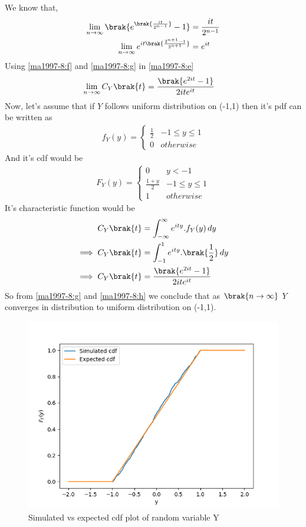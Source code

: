 We know that,
\begin{align}
    \lim_{n\to\infty}\brak{e^{\brak{\frac{it}{2^{n-1}}}}-1} &= \frac{it}{2^{n-1}}
    \label{ma1997-8:f}\\
    \lim_{n\to\infty}e^{it\brak{\frac{2^{n+1}-1}{2^{n+1}}}}&=e^{it}
    \label{ma1997-8:g}
\end{align}
Using \eqref{ma1997-8:f} and \eqref{ma1997-8:g} in \eqref{ma1997-8:e}
\begin{align}
    \lim_{n\to\infty} C_{Y}\brak{t}&=\frac{\brak{e^{2it}-1}}{2ite^{it}}
\end{align}
Now, let's assume that if $Y$ follows uniform distribution on (-1,1) then it's pdf can be written as
\begin{align}
    f_{Y}(y)=\begin{cases} 
            \frac{1}{2}  &  -1\le y\le 1\\
            0 &  otherwise
            \end{cases}
\end{align}
And it's cdf would be
\begin{align}
    F_{Y}(y)=\begin{cases} 
            0 & y<-1\\
            \frac{1+y}{2}  &  -1\le y\le 1\\
            1 &  otherwise
            \end{cases}
\end{align}
It's characteristic function would be 
\begin{align}
   C_{Y}\brak{t}&= \int_{-\infty}^{\infty} e^{ity}.f_{Y}(y) \,dy\\
    \implies C_{Y}\brak{t}&=\int_{-1}^{1} e^{ity}.\brak{\frac{1}{2}} \,dy\\
    \implies C_{Y}\brak{t}&=\frac{\brak{e^{2it}-1}}{2ite^{it}}
    \label{ma1997-8:h}
\end{align}
So from \eqref{ma1997-8:g} and \eqref{ma1997-8:h} we conclude that as $\brak{n\rightarrow\infty}$ $Y$ converges in distribution to uniform distribution on (-1,1).
\begin{figure}[h]
    \centering
    \includegraphics[width=\linewidth]{solutions/ma/1997/8/simulated_cdf.png}
    \caption{Simulated vs expected cdf plot of random variable Y}
    \label{ma1997-8:cdf_plot}
\end{figure}
